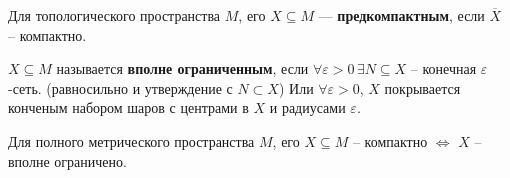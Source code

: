 
\begin{to_def}
	Для топологического пространства $M$, его $X\subseteq M$ --- \textbf{предкомпактным}, если $\overline{X}$ -- компактно.
	\label{def_9.69}
\end{to_def}

\begin{to_def}
	$X\subseteq M$ называется \textbf{вполне ограниченным}, если $\forall \varepsilon > 0 \, \exists N \subseteq X$ -- конечная $\varepsilon$-сеть. (равносильно и утверждение с $N\subset X$)
	Или $\forall \varepsilon >0$, $X$ покрывается конченым набором шаров с центрами в $X$ и радиусами $\varepsilon$.
	\label{def_9.70}
\end{to_def}

\begin{to_thr}
	Для полного метрического пространства $M$, его $X \subseteq M$ -- компактно $\Longleftrightarrow$ $X$ -- вполне ограничено.
	\label{thr_9.73}
\end{to_thr}